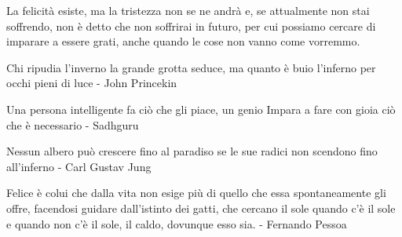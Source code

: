 \documentclass[12pt]{book} %
\begin{document}
La felicità esiste, ma la tristezza non se ne andrà e, se attualmente non stai soffrendo, non è detto che non soffrirai in futuro, per cui possiamo cercare di imparare a essere grati, anche quando le cose non vanno come vorremmo. 

Chi ripudia l'inverno la grande grotta seduce, ma quanto è buio l'inferno per occhi pieni di luce - John Princekin

Una persona intelligente fa ciò che gli piace, un genio Impara a fare con gioia ciò che è necessario - Sadhguru

Nessun albero può crescere fino al paradiso se le sue radici non scendono fino all'inferno - Carl Gustav Jung

Felice è colui che dalla vita non esige più di quello che essa spontaneamente gli offre, facendosi guidare dall'istinto
dei gatti, che cercano il sole quando c'è il sole e quando non c'è il sole, il caldo, dovunque esso sia. - Fernando
Pessoa
\end{document}
